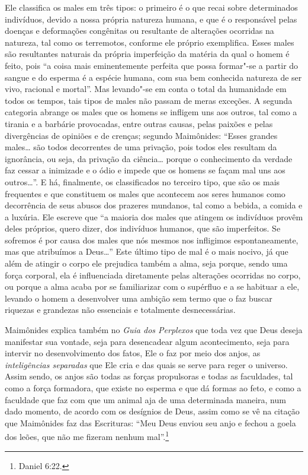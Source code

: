 Ele classifica os males em três tipos: o primeiro é o que recai sobre
determinados indivíduos, devido a nossa própria natureza humana, e que é
o responsável pelas doenças e deformações congênitas ou resultante de
alterações ocorridas na natureza, tal como os terremotos, conforme ele
próprio exemplifica. Esses males são resultantes naturais da própria
imperfeição da matéria da qual o homem é feito, pois ``a coisa mais
eminentemente perfeita que possa formar"-se a partir do sangue e do
esperma é a espécie humana, com sua bem conhecida natureza de ser vivo,
racional e mortal''. Mas levando"-se em conta o total da humanidade em
todos os tempos, tais tipos de males não passam de meras exceções. A
segunda categoria abrange os males que os homens se infligem uns aos
outros, tal como a tirania e a barbárie provocadas, entre outras causas,
pelas paixões e pelas divergências de opiniões e de crenças; segundo
Maimônides: ``Esses grandes males\ldots{} são todos decorrentes de uma
privação, pois todos eles resultam da ignorância, ou seja, da privação
da ciência\ldots{} porque o conhecimento da verdade faz cessar a inimizade
e o ódio e impede que os homens se façam mal uns aos outros\ldots{}''. E há,
finalmente, os classificados no terceiro tipo, que são os mais
frequentes e que constituem os males que acontecem aos seres humanos
como decorrência de seus abusos dos prazeres mundanos, tal como a
bebida, a comida e a luxúria. Ele escreve que ``a maioria dos males que
atingem os indivíduos provêm deles próprios, quero dizer, dos indivíduos
humanos, que são imperfeitos. Se sofremos é por causa dos males que nós
mesmos nos infligimos espontaneamente, mas que atribuímos a Deus\ldots{}''
Este último tipo de mal é o mais nocivo, já que além de atingir o corpo
ele prejudica também a alma, seja porque, sendo uma força corporal, ela
é influenciada diretamente pelas alterações ocorridas no corpo, ou
porque a alma acaba por se familiarizar com o supérfluo e a se habituar
a ele, levando o homem a desenvolver uma ambição sem termo que o faz
buscar riquezas e grandezas não essenciais e totalmente desnecessárias.

Maimônides explica também no \emph{Guia dos Perplexos} que toda vez que
Deus deseja manifestar sua vontade, seja para desencadear algum
acontecimento, seja para intervir no desenvolvimento dos fatos, Ele o
faz por meio dos anjos, as \emph{inteligências separadas} que Ele cria e
das quais se serve para reger o universo. Assim sendo, os anjos são
todas as forças propulsoras e todas as faculdades, tal como a força
formadora, que existe no esperma e que dá formas ao feto, e como a faculdade 
que faz com que um animal aja de uma
determinada maneira, num dado momento, de acordo com os desígnios de
Deus, assim como se vê na citação que Maimônides faz das Escrituras:
``Meu Deus enviou seu anjo e fechou a goela dos leões, que não me
fizeram nenhum mal''.\footnote{Daniel 6:22.}

